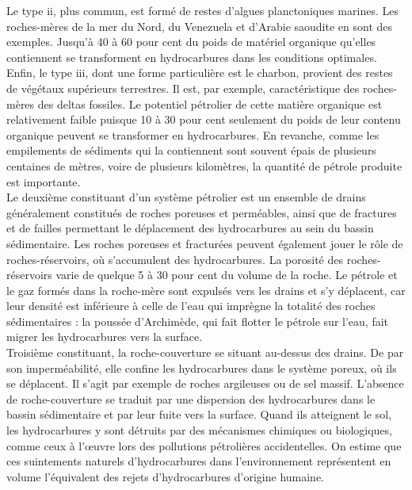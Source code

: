 \documentclass[8pt]{article}
\begin{document}
Le type ii, plus commun, est formé de restes d'algues planctoniques marines. Les roches-mères de la mer du Nord, du Venezuela et d'Arabie saoudite en sont des exemples. Jusqu'à 40 à 60 pour cent du poids de matériel organique qu'elles contiennent se transforment en hydrocarbures dans les conditions optimales. Enfin, le type iii, dont une forme particulière est le charbon, provient des restes de végétaux supérieurs terrestres. Il est, par exemple, caractéristique des roches-mères des deltas fossiles. Le potentiel pétrolier de cette matière organique est relativement faible puisque 10 à 30 pour cent seulement du poids de leur contenu organique peuvent se transformer en hydrocarbures. En revanche, comme les empilements de sédiments qui la contiennent sont souvent épais de plusieurs centaines de mètres, voire de plusieurs kilomètres, la quantité de pétrole produite est importante.\\

Le deuxième constituant d'un système pétrolier est un ensemble de drains généralement constitués de roches poreuses et perméables, ainsi que de fractures et de failles permettant le déplacement des hydrocarbures au sein du bassin sédimentaire. Les roches poreuses et fracturées peuvent également jouer le rôle de roches-réservoirs, où s'accumulent des hydrocarbures. La porosité des roches-réservoirs varie de quelque 5 à 30 pour cent du volume de la roche. Le pétrole et le gaz formés dans la roche-mère sont expulsés vers les drains et s'y déplacent, car leur densité est inférieure à celle de l'eau qui imprègne la totalité des roches sédimentaires : la poussée d'Archimède, qui fait flotter le pétrole sur l'eau, fait migrer les hydrocarbures vers la surface.\\

Troisième constituant, la roche-couverture se situant au-dessus des drains. De par son imperméabilité, elle confine les hydrocarbures dans le système poreux, où ils se déplacent. Il s'agit par exemple de roches argileuses ou de sel massif. L'absence de roche-couverture se traduit par une dispersion des hydrocarbures dans le bassin sédimentaire et par leur fuite vers la surface. Quand ils atteignent le sol, les hydrocarbures y sont détruits par des mécanismes chimiques ou biologiques, comme ceux à l'œuvre lors des pollutions pétrolières accidentelles. On estime que ces suintements naturels d'hydrocarbures dans l'environnement représentent en volume l'équivalent des rejets d'hydrocarbures d'origine humaine.\\
\end{document}
